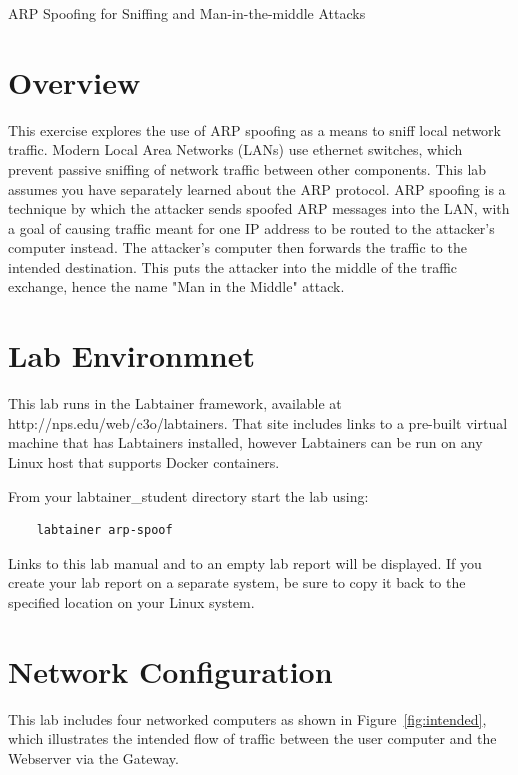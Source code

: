 


\begin{center}
{\LARGE ARP Spoofing for Sniffing and Man-in-the-middle Attacks}
\vspace{0.1in}\\
\end{center}

\copyrightnotice

\section{Overview}
This exercise explores the use of ARP spoofing as a means to
sniff local network traffic.  Modern Local Area Networks (LANs)
use ethernet switches, which prevent passive sniffing of network
traffic between other components.  This lab assumes you have
separately learned about the ARP protocol.  ARP spoofing is
a technique by which the attacker sends spoofed ARP messages
into the LAN, with a goal of causing traffic meant for one IP
address to be routed to the attacker's computer instead.  The
attacker's computer then forwards the traffic to the intended
destination.  This puts the attacker into the middle of the
traffic exchange, hence the name "Man in the Middle" attack.

\section{Lab Environmnet}
This lab runs in the Labtainer framework,
available at http://nps.edu/web/c3o/labtainers.
That site includes links to a pre-built virtual machine
that has Labtainers installed, however Labtainers can
be run on any Linux host that supports Docker containers.

From your labtainer_student directory start the lab using:
\begin{verbatim}
    labtainer arp-spoof
\end{verbatim}
Links to this lab manual and to an empty lab report will be displayed.  If you create your lab report on a separate system, 
be sure to copy it back to the specified location on your Linux system.


\section{Network Configuration}
This lab includes four networked computers as shown in Figure~\ref{fig:intended},
which illustrates the intended flow of traffic between the user computer and
the Webserver via the Gateway.  

